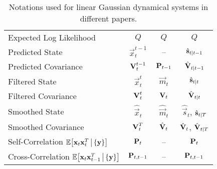\begin{table}[ht]
\begin{tabular}{l|ccc}
				Expected Log Likelihood      & \( Q \)                         & \( Q \)                 & \( Q \)                                                    \\
				Predicted State              & \( \vec{x}_t^{t - 1} \)         & --                      & \( \hat{\boldsymbol{\mathrm{s}}}_{t \vert t - 1} \)                    \\
				Predicted Covariance         & \( \boldsymbol{\mathrm{V}}_t^{t - 1} \)         & \( \boldsymbol{\mathrm{P}}_{t - 1} \)   & \( \hat{\boldsymbol{\mathrm{V}}}_{t \vert t - 1} \)                    \\
				Filtered State               & \( \vec{x}_t^t \)               & \( \vec{m}_t \)         & \( \hat{\boldsymbol{\mathrm{s}}}_{t \vert t} \)                        \\
				Filtered Covariance          & \( \boldsymbol{\mathrm{V}}_t^t \)               & \( \boldsymbol{\mathrm{V}}_t \)         & \( \hat{\boldsymbol{\mathrm{V}}}_{t \vert t} \)                        \\
				Smoothed State               & \( \hat{\vec{x}}_t \)           & \( \hat{\vec{m}}_t \)   & \( \hat{\vec{s}}_t \), \( \hat{\boldsymbol{\mathrm{s}}}_{t \vert T} \) \\
				Smoothed Covariance          & \( \boldsymbol{\mathrm{V}}_t^T \)               & \( \hat{\boldsymbol{\mathrm{V}}}_t \)   & \( \hat{\boldsymbol{\mathrm{V}}}_t \), \( \hat{\boldsymbol{\mathrm{V}}}_{t \vert T} \) \\
				Self-Correlation \( \mathbb{E}\big[\boldsymbol{\mathrm{x}}_t \boldsymbol{\mathrm{x}}_t^T \,\big\vert\, \{ \boldsymbol{\mathrm{y}} \}\big] \)
				                             & \( \boldsymbol{\mathrm{P}}_t \)                 & --                      & \( \boldsymbol{\mathrm{P}}_t \)                                            \\
				Cross-Correlation \( \mathbb{E}\big[\boldsymbol{\mathrm{x}}_t \boldsymbol{\mathrm{x}}_{t-1}^T \,\big\vert\, \{ \boldsymbol{\mathrm{y}} \}\big] \)
				                             & \( \boldsymbol{\mathrm{P}}_{t, t - 1} \)        & --                      & \( \boldsymbol{\mathrm{P}}_{t, t - 1} \)
			\end{tabular}
			\caption[Notations used for linear Gaussian dynamical systems in different papers]{Notations used for linear Gaussian dynamical systems in different papers.}
		\end{table}

